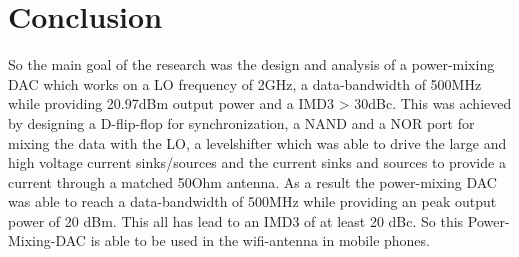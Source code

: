 \section{Conclusion}\label{sec:conclusion}
So the main goal of the research was the design and analysis of a power-mixing DAC which works on a LO frequency of 2GHz, a data-bandwidth of 500MHz while providing 20.97dBm output power and a IMD3 > 30dBc. This was achieved by designing a D-flip-flop for synchronization, a NAND and a NOR port for mixing the data with the LO, a levelshifter which was able to drive the large and high voltage current sinks/sources and the current sinks and sources to provide a current through a matched 50Ohm antenna. As a result the power-mixing DAC was able to reach a data-bandwidth of 500MHz while providing an peak output power of 20 dBm. This all has lead to an IMD3 of at least 20 dBc. So this Power-Mixing-DAC is able to be used in the wifi-antenna in mobile phones. 